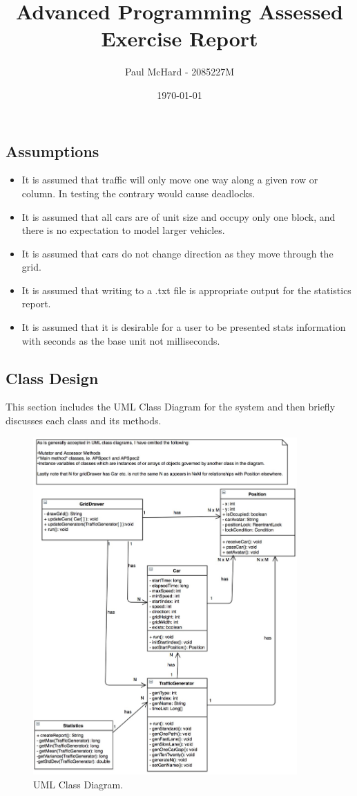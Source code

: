 \documentclass[11pt, oneside]{article}
\title{Advanced Programming Assessed Exercise Report}
\author{Paul McHard - 2085227M}
\date{\today}
\begin{document}
\maketitle
\subsection*{Assumptions}
\begin{itemize}
\item{It is assumed that traffic will only move one way along a given row or column. In testing the contrary would cause deadlocks.}
\item{It is assumed that all cars are of unit size and occupy only one block, and there is no expectation to model larger vehicles.}
\item{It is assumed that cars do not change direction as they move through the grid.}
\item{It is assumed that writing to a .txt file is appropriate output for the statistics report.}
\item{It is assumed that it is desirable for a user to be presented stats information with seconds as the base unit not milliseconds.}
\end{itemize}

\subsection*{Class Design}
This section includes the UML Class Diagram for the system and then briefly discusses each class and its methods.
\newpage

\begin{figure}[h!]
\centering
\includegraphics[width=0.9\textwidth]{APAEUML}
\caption{UML Class Diagram.}
\end{figure}
\end{document}
